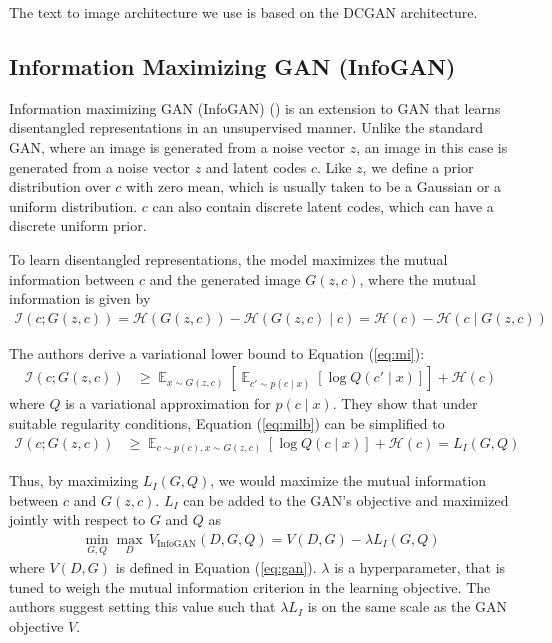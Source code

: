 \documentclass{article}
\DeclareMathOperator*{\E}{\mathbb{E}}
\begin{document}
The text to image architecture we use is based on the DCGAN architecture.



\subsection{Information Maximizing GAN (InfoGAN)}

Information maximizing GAN (InfoGAN) (\cite{infogan}) is an extension to GAN that learns disentangled representations in an unsupervised manner. Unlike the standard GAN, where an image is generated from a noise vector $z$, an image in this case is generated from a noise vector $z$ and latent codes $c$. Like $z$, we define a prior distribution over $c$ with zero mean, which is usually taken to be a Gaussian or a uniform distribution. $c$ can also contain discrete latent codes, which can have a discrete uniform prior.

To learn disentangled representations, the model maximizes the mutual information between $c$ and the generated image $G(z,c)$, where the mutual information is given by
\begin{align}
\mathcal{I}(c;G(z,c)) = \mathcal{H}(G(z,c)) - \mathcal{H}(G(z,c) \mid c) = \mathcal{H}(c) - \mathcal{H}(c\mid G(z,c)) \label{eq:mi}
\end{align}

The authors derive a variational lower bound to Equation (\ref{eq:mi}):
\begin{align}
\mathcal{I}(c;G(z,c)) &\geq \E_{x\sim G(z,c)}\left[\E_{c'\sim p(c\mid x)}\left[\log Q(c'\mid x)\right]\right] + \mathcal{H}(c) \label{eq:milb}
\end{align}
where $Q$ is a variational approximation for $p(c\mid x)$. They show that under suitable regularity conditions, Equation (\ref{eq:milb}) can be simplified to
\begin{align}
\mathcal{I}(c;G(z,c)) &\geq \E_{c\sim p(c), x\sim G(z,c)}\left[\log Q(c\mid x)\right] + \mathcal{H}(c) = L_I(G,Q) \label{eq:miloss}
\end{align}

Thus, by maximizing $L_I(G,Q)$, we would maximize the mutual information between $c$ and $G(z,c)$. $L_I$ can be added to the GAN's objective and maximized jointly with respect to $G$ and $Q$ as
\begin{align}
\min_{G,Q} \max_D\, V_{\text{InfoGAN}}(D,G,Q) = V(D,G) - \lambda L_I(G,Q)
\end{align}
where $V(D,G)$ is defined in Equation (\ref{eq:gan}). $\lambda$ is a hyperparameter, that is tuned to weigh the mutual information criterion in the learning objective. The authors suggest setting this value such that $\lambda L_I$ is on the same scale as the GAN objective $V$.
\end{document}
